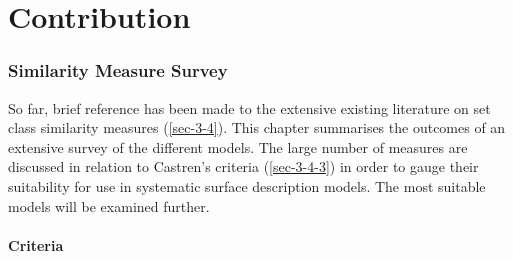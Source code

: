 \documentclass{article}
\begin{document}
\clearpage
\part{Contribution}
\section{Similarity Measure Survey}
\label{sec-6}

So far, brief reference has been made to the extensive existing
literature on set class similarity measures (\ref{sec-3-4}). This chapter summarises the outcomes of an extensive
survey of the different models. The large number of measures are
discussed in relation to Castren's criteria (\ref{sec-3-4-3}) in
order to gauge their suitability for use in systematic surface
description models. The most suitable models will be examined further.
\subsection{Criteria}
\label{sec-6-1}
\end{document}
